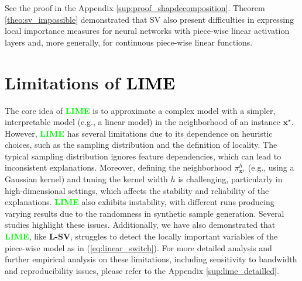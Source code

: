 \documentclass{article}
\newcommand\x{\boldsymbol{x}}
\theoremstyle{plain}
\theoremstyle{definition}
\theoremstyle{remark}
\newcommand{\lsv}{\textcolor{lsv}{\textbf{L-SV}}}
\newcommand{\lime}{\textcolor{lime}{\textbf{LIME}}}
\begin{document}
See the proof in the Appendix \ref{sup:proof_shapdecomposition}.  Theorem \ref{theo:sv_impossible} demonstrated that SV also present difficulties in expressing local importance measures for neural networks with piece-wise linear activation layers and, more generally, for continuous piece-wise linear functions.
\section{Limitations of \textcolor{black}{LIME}}

The core idea of \lime{} \citep{ribeiro2016why} is to approximate a complex model with a simpler, interpretable model (e.g., a linear model) in the neighborhood of an instance $\x^\star$. However, \lime{} has several limitations due to its dependence on heuristic choices, such as the sampling distribution and the definition of locality. The typical sampling distribution ignores feature dependencies, which can lead to inconsistent explanations. Moreover, defining the neighborhood $\pi_{\x^\star}^h$ (e.g., using a Gaussian kernel) and tuning the kernel width $h$ is challenging, particularly in high-dimensional settings, which affects the stability and reliability of the explanations. \lime{} also exhibits instability, with different runs producing varying results due to the randomness in synthetic sample generation. Several studies \citep{Zafar2019DLIMEAD, Visani2020OptiLIMEOL,zhang2019should, alvarez2018robustness, Zhou2021SLIMESF} highlight these issues. Additionally, we have also demonstrated that \lime{}, like \lsv{}, struggles to detect the locally important variables of the piece-wise model as in (\ref{eq:linear_switch}). For more detailed analysis and further empirical analysis on these limitations, including sensitivity to bandwidth and reproducibility issues, please refer to the Appendix \ref{sup:lime_detailled}.
\end{document}
